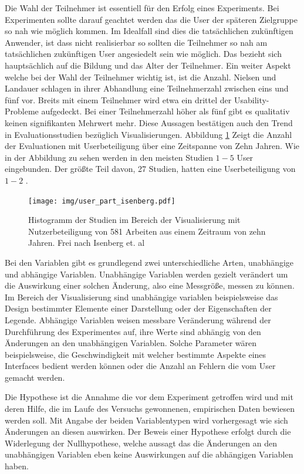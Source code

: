 \documentclass[draft=false
              ,paper=a4
              ,twoside=false
              ,fontsize=11pt
              ,headsepline
              ,BCOR10mm
              ,DIV11
              ]{scrbook}
\begin{document}
Die Wahl der Teilnehmer ist essentiell für den Erfolg eines Experiments. Bei Experimenten sollte darauf geachtet werden das die User der späteren Zielgruppe so nah wie möglich kommen. Im Idealfall sind dies die tatsächlichen zukünftigen Anwender, ist dass nicht realisierbar so sollten die Teilnehmer so nah am tatsächlichen zukünftigen User angesiedelt sein wie möglich. Das bezieht sich hauptsächlich auf die Bildung und das Alter der Teilnehmer. Ein weiter Aspekt welche bei der Wahl der Teilnehmer wichtig ist, ist die Anzahl. Nielsen und Landauer \cite{nielsen_mathematical_1993} schlagen in ihrer Abhandlung eine Teilnehmerzahl zwischen eins und fünf vor. Breits mit einem Teilnehmer wird etwa ein drittel der Usability-Probleme aufgedeckt. Bei einer Teilnehmerzahl höher als fünf gibt es qualitativ keinen signifikanten Mehrwert mehr. Diese Aussagen bestätigen auch den Trend in Evaluationsstudien bezüglich Visualisierungen. Abbildung \ref{fig:no_of_users} Zeigt die Anzahl der Evaluationen mit Userbeteiligung über eine Zeitspanne von Zehn Jahren. Wie in der Abbildung zu sehen werden in den meisten Studien $1 - 5$ User eingebunden. Der größte Teil davon, 27 Studien, hatten eine Userbeteiligung von $1 - 2$ \cite{isenberg_systematic_2013}. 

\begin{figure}[htbp]
  \centering
  \texttt{[image: img/user\_part\_isenberg.pdf]}
  \caption{Histogramm der Studien im Bereich der Visualisierung mit Nutzerbeteiligung von 581 Arbeiten aus einem Zeitraum von zehn Jahren. Frei nach Isenberg et. al \cite{isenberg_systematic_2013}}
  \label{fig:no_of_users}
\end{figure}

Bei den Variablen gibt es grundlegend zwei unterschiedliche Arten, unabhängige und abhängige Variablen. Unabhängige Variablen werden gezielt verändert um die Auswirkung einer solchen Änderung, also eine Messgröße, messen zu können. Im Bereich der Visualisierung sind unabhängige variablen beispielsweise das Design bestimmter Elemente einer Darstellung oder der Eigenschaften der Legende. Abhängige Variablen weisen messbare Veränderung während der Durchführung des Experimentes auf, ihre Werte sind abhängig von den Änderungen an den unabhängigen Variablen. Solche Parameter wären beispielsweise, die Geschwindigkeit mit welcher bestimmte Aspekte eines Interfaces bedient werden können oder die Anzahl an Fehlern die vom User gemacht werden. 

Die Hypothese ist die Annahme die vor dem Experiment getroffen wird und mit deren Hilfe, die im Laufe des Versuchs gewonnenen, empirischen Daten bewiesen werden soll. Mit Angabe der beiden Variablentypen wird vorhergesagt wie sich Änderungen an diesen auswirken. Der Beweis einer Hypothese erfolgt durch die Widerlegung der Nullhypothese, welche aussagt das die Änderungen an den unabhängigen Variablen eben keine Auswirkungen auf die abhängigen Variablen haben. 
\end{document}
